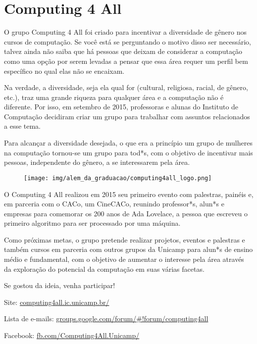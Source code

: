 
\section{Computing 4 All}

O grupo Computing 4 All foi criado para incentivar a diversidade de gênero nos
cursos de computação. Se você está se perguntando o motivo disso ser necessário,
talvez ainda não saiba que há pessoas que deixam de considerar a computação como
uma opção por serem levadas a pensar que essa área requer um perfil bem
específico no qual elas não se encaixam.

Na verdade, a diversidade, seja ela qual for (cultural, religiosa, racial, de
gênero, etc.), traz uma grande riqueza para qualquer área e a computação não é
diferente. Por isso, em setembro de 2015, professoras e alunas do Instituto de
Computação decidiram criar um grupo para trabalhar com assuntos relacionados a
esse tema.

Para alcançar a diversidade desejada, o que era a princípio um grupo de mulheres
na computação tornou-se um grupo para tod*s, com o objetivo de incentivar mais
pessoas, independente do gênero, a se interessarem pela área.

\begin{figure}[H]
    \centering
    \texttt{[image: img/alem\_da\_graduacao/computing4all\_logo.png]}
\end{figure}

O Computing 4 All realizou em 2015 seu primeiro evento com palestras, painéis e,
em parceria com o CACo, um CineCACo, reunindo professor*s, alun*s e empresas
para comemorar os 200 anos de Ada Lovelace, a pessoa que escreveu o primeiro
algoritmo para ser processado por uma máquina.

Como próximas metas, o grupo pretende realizar projetos, eventos e palestras e
também cursos em parceria com outros grupos da Unicamp para alun*s de ensino
médio e fundamental, com o objetivo de aumentar o interesse pela área através da
exploração do potencial da computação em suas várias facetas.

Se gostou da ideia, venha participar!

\begin{compactitemize}
\item Site: \url{computing4all.ic.unicamp.br/}
\item Lista de e-mails: \url{groups.google.com/forum/\#!forum/computing4all}
\item Facebook: \url{fb.com/Computing4All.Unicamp/}
\end{compactitemize}
